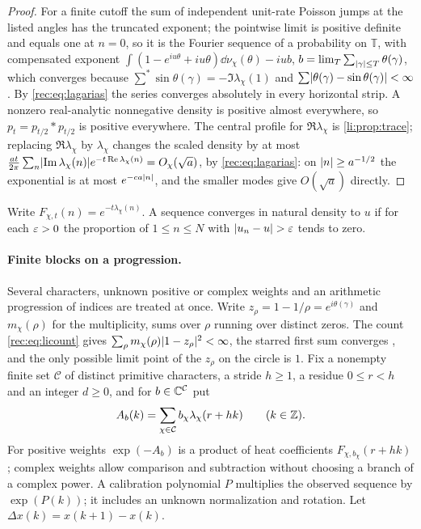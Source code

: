 \begin{proof}
For a finite cutoff the sum of independent unit-rate Poisson jumps at the listed angles has the
truncated exponent; the pointwise limit is positive definite and equals one at $n=0$, so it is the
Fourier sequence of a probability on $\mathbb T$, with compensated exponent
$\int(1-e^{iu\theta}+iu\theta)\dd\nu_\chi(\theta)-iub$, $b=\lim_T\sum_{\lvert\gamma\rvert\le T}\theta(\gamma)$, which converges because
$\sum^*\sin\theta(\gamma)=-\Im\lambda_\chi(1)$ and $\sum\lvert\theta(\gamma)-\sin\theta(\gamma)\rvert<\infty$. By \eqref{rec:eq:lagarias} the series converges
absolutely in every horizontal strip. A nonzero real-analytic nonnegative density is positive almost
everywhere, so $p_t=p_{t/2}*p_{t/2}$ is positive everywhere. The central profile for $\Re\lambda_\chi$ is
\cref{li:prop:trace}; replacing $\Re\lambda_\chi$ by $\lambda_\chi$ changes the scaled density by at most
$\frac{at}{2\pi}\sum_n\lvert\operatorname{Im}\lambda_\chi(n)\rvert e^{-t\operatorname{Re}\lambda_\chi(n)}=O_\chi(\sqrt a)$, by \eqref{rec:eq:lagarias}: on $\lvert n\rvert\ge a^{-1/2}$ the
exponential is at most $e^{-ca\lvert n\rvert}$, and the smaller modes give $O(\sqrt a)$ directly.
\end{proof}

Write $F_{\chi,t}(n)=e^{-t\lambda_\chi(n)}$. A sequence converges in natural density to $u$ if for each $\varepsilon>0$ the
proportion of $1\le n\le N$ with $\lvert u_n-u\rvert>\varepsilon$ tends to zero.

\paragraph{Finite blocks on a progression.}
Several characters, unknown positive or complex weights and an arithmetic progression of indices are
treated at once. Write $z_\rho=1-1/\rho=e^{i\theta(\gamma)}$ and $m_\chi(\rho)$ for the multiplicity, sums over $\rho$ running
over distinct zeros. The count \eqref{rec:eq:licount} gives $\sum_\rho m_\chi(\rho)\lvert1-z_\rho\rvert^2<\infty$, the starred first sum
converges \cite{Lagarias2007Li}, and the only possible limit point of the $z_\rho$ on the circle is $1$. Fix a nonempty
finite set $\mathcal C$ of distinct primitive characters, a stride $h\ge1$, a residue $0\le r<h$ and an integer $d\ge0$, and
for $b\in\mathbb{C}^{\mathcal C}$ put
\[
 A_b(k)=\sum_{\chi\in\mathcal C}b_\chi\lambda_\chi(r+hk)\qquad(k\in\mathbb{Z}).
\]
For positive weights $\exp(-A_b)$ is a product of heat coefficients $F_{\chi,b_\chi}(r+hk)$; complex weights allow
comparison and subtraction without choosing a branch of a complex power. A calibration polynomial $P$
multiplies the observed sequence by $\exp(P(k))$; it includes an unknown normalization and rotation. Let
$\Delta x(k)=x(k+1)-x(k)$.

